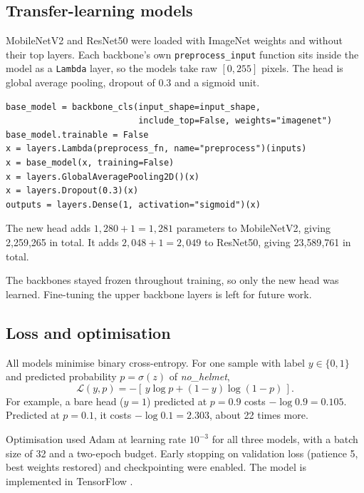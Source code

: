 \documentclass[conference]{IEEEtran}
\begin{document}
\subsection{Transfer-learning models}
MobileNetV2 \cite{sandler2018mobilenetv2} and ResNet50 \cite{he2016deep} were loaded with ImageNet weights and without their top layers. Each backbone's own \texttt{preprocess\_input} function sits inside the model as a \texttt{Lambda} layer, so the models take raw $[0,255]$ pixels. The head is global average pooling, dropout of 0.3 and a sigmoid unit.

\begin{lstlisting}
base_model = backbone_cls(input_shape=input_shape,
                          include_top=False, weights="imagenet")
base_model.trainable = False
x = layers.Lambda(preprocess_fn, name="preprocess")(inputs)
x = base_model(x, training=False)
x = layers.GlobalAveragePooling2D()(x)
x = layers.Dropout(0.3)(x)
outputs = layers.Dense(1, activation="sigmoid")(x)
\end{lstlisting}

The new head adds $1{,}280 + 1 = 1{,}281$ parameters to MobileNetV2, giving 2{,}259{,}265 in total. It adds $2{,}048 + 1 = 2{,}049$ to ResNet50, giving 23{,}589{,}761 in total.

The backbones stayed frozen throughout training, so only the new head was learned. Fine-tuning the upper backbone layers is left for future work.

\subsection{Loss and optimisation}
All models minimise binary cross-entropy. For one sample with label $y \in \{0,1\}$ and predicted probability $p = \sigma(z)$ of \emph{no\_helmet},
\begin{equation}
\mathcal{L}(y, p) = -\left[\, y \log p + (1 - y)\log(1 - p) \,\right].
\end{equation}
For example, a bare head ($y=1$) predicted at $p=0.9$ costs $-\log 0.9 = 0.105$. Predicted at $p=0.1$, it costs $-\log 0.1 = 2.303$, about 22 times more.

Optimisation used Adam \cite{kingma2015adam} at learning rate $10^{-3}$ for all three models, with a batch size of 32 and a two-epoch budget. Early stopping on validation loss (patience 5, best weights restored) and checkpointing were enabled. The model is implemented in TensorFlow \cite{abadi2016tensorflow}.
\end{document}
